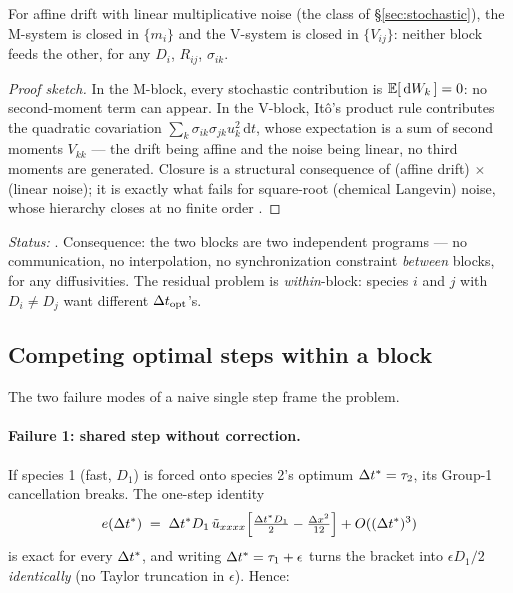 \begin{proposition}\label{prop:decouple}
For affine drift with linear multiplicative noise (the class of
\S\ref{sec:stochastic}), the M-system is closed in $\{m_i\}$ and the
V-system is closed in $\{V_{ij}\}$: neither block feeds the other, for any
$D_i$, $R_{ij}$, $\sigma_{ik}$.
\end{proposition}
\begin{proof}[Proof sketch]
In the M-block, every stochastic contribution is $\mathbb{E}[\,\mathrm{d}W_k\,]=0$: no
second-moment term can appear. In the V-block, It\^o's product rule contributes
the quadratic covariation $\sum_k \sigma_{ik}\sigma_{jk}u_k^2\,\mathrm{d}t$,
whose expectation is a sum of second moments $V_{kk}$ --- the drift being affine
and the noise being linear, no third moments are generated. Closure is a
structural consequence of (affine drift) $\times$ (linear noise); it is exactly
what fails for square-root (chemical Langevin) noise, whose hierarchy closes at
no finite order \citep{jovanovski2025}.
\end{proof}
\noindent\emph{Status:} \tagP. Consequence: the two blocks are two independent
programs --- no communication, no interpolation, no synchronization constraint
\emph{between} blocks, for any diffusivities. The residual problem is
\emph{within}-block: species $i$ and $j$ with $D_i \ne D_j$ want different
$\Delta t_{\mathrm{opt}}$'s.

\subsection{Competing optimal steps within a block}

The two failure modes of a naive single step frame the problem.

\paragraph{Failure 1: shared step without correction.} If species 1 (fast,
$D_1$) is forced onto species 2's optimum $\Delta t^\ast=\tau_2$, its Group-1
cancellation breaks. The one-step identity
\begin{equation}\label{eq:mismatchid}
e(\Delta t^\ast) \;=\; \Delta t^\ast D_1\,\tilde u_{xxxx}
\Bigl[\tfrac{\Delta t^\ast D_1}{2} - \tfrac{\Delta x^2}{12}\Bigr] + O((\Delta t^\ast)^3)
\end{equation}
is exact for every $\Delta t^\ast$, and writing $\Delta t^\ast = \tau_1 + \epsilon$ turns
the bracket into $\epsilon D_1/2$ \emph{identically} (no Taylor truncation in
$\epsilon$). Hence:

